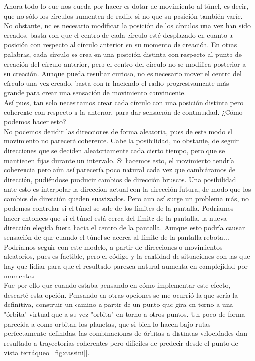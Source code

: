 Ahora todo lo que nos queda por hacer es dotar de movimiento al túnel, es decir, que no sólo los círculos aumenten de radio, si no que su posición también varíe. No obstante, no es necesario modificar la posición de los círculos una vez han sido creados, basta con que el centro de cada círculo esté desplazado en cuanto a posición con respecto al círculo anterior en su momento de creación. En otras palabras, cada círculo se crea en una posición distinta con respecto al punto de creación del círculo anterior, pero el centro del círculo no se modifica posterior a su creación. Aunque pueda resultar curioso, no es necesario mover el centro del círculo una vez creado, basta con ir haciendo el radio progresivamente más grande para crear una sensación de movimiento convincente.\\

Así pues, tan solo necesitamos crear cada círculo con una posición distinta pero coherente con respecto a la anterior, para dar sensación de continuidad. ¿Cómo podemos hacer esto?\\

No podemos decidir las direcciones de forma aleatoria, pues de este modo el movimiento no parecerá coherente. Cabe la posibilidad, no obstante, de seguir direcciones que se deciden aleatoriamente cada cierto tiempo, pero que se mantienen fijas durante un intervalo. Si hacemos esto, el movimiento tendría coherencia pero aún así parecería poco natural cada vez que cambiáramos de dirección, pudiéndose producir cambios de dirección bruscos. Una posibilidad ante esto es interpolar la dirección actual con la dirección futura, de modo que los cambios de dirección queden suavizados. Pero aun así surge un problema más, no podemos controlar si el túnel se sale de los límites de la pantalla. Podríamos hacer entonces que si el túnel está cerca del límite de la pantalla, la nueva dirección elegida fuera hacia el centro de la pantalla. Aunque esto podría causar sensación de que cuando el túnel se acerca al límite de la pantalla rebota... Podríamos seguir con este modelo, a partir de direcciones o movimientos aleatorios, pues es factible, pero el código y la cantidad de situaciones con las que hay que lidiar para que el resultado parezca natural aumenta en  complejidad por momentos.\\

Fue por ello que cuando estaba pensando en cómo implementar este efecto, descarté esta opción. Pensando en otras opciones se me ocurrió la que sería la definitiva, construir un camino a partir de un punto que gira en torno a una "órbita" virtual que a su vez "orbita" en torno a otros puntos. Un poco de forma parecida a como orbitan los planetas, que si bien lo hacen bajo rutas perfectamente definidas, las combinaciones de órbitas a distintas velocidades dan resultado a trayectorias coherentes pero difíciles de predecir desde el punto de vista terráqueo [\ref{fig:cassini}].\\

